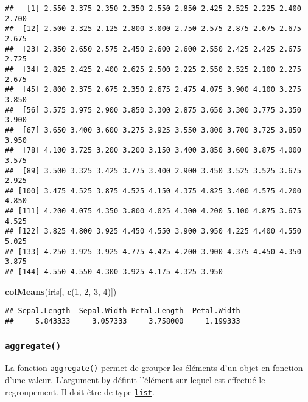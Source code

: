 \documentclass[]{book}
\newenvironment{Shaded}{\begin{snugshade}}{\end{snugshade}}
\newcommand{\KeywordTok}[1]{\textcolor[rgb]{0.13,0.29,0.53}{\textbf{#1}}}
\newcommand{\DataTypeTok}[1]{\textcolor[rgb]{0.13,0.29,0.53}{#1}}
\newcommand{\DecValTok}[1]{\textcolor[rgb]{0.00,0.00,0.81}{#1}}
\newcommand{\OperatorTok}[1]{\textcolor[rgb]{0.81,0.36,0.00}{\textbf{#1}}}
\newcommand{\NormalTok}[1]{#1}
\theoremstyle{definition}
\theoremstyle{definition}
\theoremstyle{definition}
\theoremstyle{remark}
\begin{document}
\begin{verbatim}
##   [1] 2.550 2.375 2.350 2.350 2.550 2.850 2.425 2.525 2.225 2.400 2.700
##  [12] 2.500 2.325 2.125 2.800 3.000 2.750 2.575 2.875 2.675 2.675 2.675
##  [23] 2.350 2.650 2.575 2.450 2.600 2.600 2.550 2.425 2.425 2.675 2.725
##  [34] 2.825 2.425 2.400 2.625 2.500 2.225 2.550 2.525 2.100 2.275 2.675
##  [45] 2.800 2.375 2.675 2.350 2.675 2.475 4.075 3.900 4.100 3.275 3.850
##  [56] 3.575 3.975 2.900 3.850 3.300 2.875 3.650 3.300 3.775 3.350 3.900
##  [67] 3.650 3.400 3.600 3.275 3.925 3.550 3.800 3.700 3.725 3.850 3.950
##  [78] 4.100 3.725 3.200 3.200 3.150 3.400 3.850 3.600 3.875 4.000 3.575
##  [89] 3.500 3.325 3.425 3.775 3.400 2.900 3.450 3.525 3.525 3.675 2.925
## [100] 3.475 4.525 3.875 4.525 4.150 4.375 4.825 3.400 4.575 4.200 4.850
## [111] 4.200 4.075 4.350 3.800 4.025 4.300 4.200 5.100 4.875 3.675 4.525
## [122] 3.825 4.800 3.925 4.450 4.550 3.900 3.950 4.225 4.400 4.550 5.025
## [133] 4.250 3.925 3.925 4.775 4.425 4.200 3.900 4.375 4.450 4.350 3.875
## [144] 4.550 4.550 4.300 3.925 4.175 4.325 3.950
\end{verbatim}

\begin{Shaded}
\begin{Highlighting}[]
\KeywordTok{colMeans}\NormalTok{(iris[, }\KeywordTok{c}\NormalTok{(}\DecValTok{1}\NormalTok{, }\DecValTok{2}\NormalTok{, }\DecValTok{3}\NormalTok{, }\DecValTok{4}\NormalTok{)])}
\end{Highlighting}
\end{Shaded}

\begin{verbatim}
## Sepal.Length  Sepal.Width Petal.Length  Petal.Width 
##     5.843333     3.057333     3.758000     1.199333
\end{verbatim}

\subsubsection{\texorpdfstring{\texttt{aggregate()}}{aggregate()}}\label{l015aggregate}

La fonction \texttt{aggregate()} permet de grouper les éléments d'un
objet en fonction d'une valeur. L'argument \texttt{by} définit l'élément
sur lequel est effectué le regroupement. Il doit être de type
\protect\hyperlink{l014list}{\texttt{list}}.

\begin{Shaded}
\end{Shaded}
\end{document}
